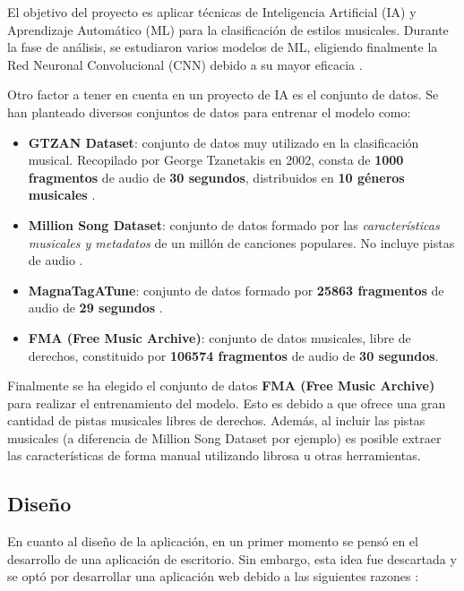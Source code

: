 El objetivo del proyecto es aplicar técnicas de Inteligencia Artificial (IA) y Aprendizaje Automático (ML) para la clasificación de estilos musicales. 
Durante la fase de análisis, se estudiaron varios modelos de ML, eligiendo finalmente la Red Neuronal Convolucional (CNN) debido a su mayor eficacia \cite{article_cnn}.

Otro factor a tener en cuenta en un proyecto de IA es el conjunto de datos. Se han planteado diversos conjuntos de datos para entrenar el modelo como:
\begin{itemize}

\item \textbf{GTZAN Dataset}: conjunto de datos muy utilizado en la clasificación musical. Recopilado por George Tzanetakis en 2002, consta de \textbf{1000 fragmentos} de audio de \textbf{30 segundos}, distribuidos en \textbf{10 géneros musicales} \cite{Andrada_2020}.

\item \textbf{Million Song Dataset}: conjunto de datos formado por las \textit{características musicales y metadatos} de un millón de canciones populares. No incluye pistas de audio \cite{Bertin-Mahieux2011, MSD}.

\item \textbf{MagnaTagATune}: conjunto de datos formado por \textbf{25863 fragmentos} de audio de \textbf{29 segundos} \cite{MagnaTagATune}.

\item \textbf{FMA (Free Music Archive)}: conjunto de datos musicales, libre de derechos, constituido por \textbf{106574 fragmentos} de audio de \textbf{30 segundos}. \cite{defferrard2017fma}

\end{itemize}

Finalmente se ha elegido el conjunto de datos \textbf{FMA (Free Music Archive)} para realizar el entrenamiento del modelo. Esto es debido a que ofrece una gran cantidad de pistas musicales libres de derechos. Además, al incluir las pistas musicales (a diferencia de Million Song Dataset por ejemplo)
es posible extraer las características de forma manual utilizando librosa u otras herramientas.

\subsection{Diseño}

En cuanto al diseño de la aplicación, en un primer momento se pensó en el desarrollo de una aplicación de escritorio. Sin embargo, esta idea fue descartada y se optó por desarrollar una aplicación web debido a las siguientes razones \cite{Desai_2023}:

